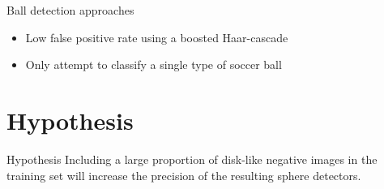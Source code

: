 \begin{frame}{Ball detection approaches}
	\citet{treptow2004filter}
	\begin{itemize}
		\item Low false positive rate using a boosted Haar-cascade
		\item Only attempt to classify a single type of soccer ball
	\end{itemize}
\end{frame}

\section{Hypothesis}
\begin{frame}{Hypothesis}
	Including a large proportion of disk-like negative images in the training set will increase the precision of the resulting sphere detectors.
\end{frame}

